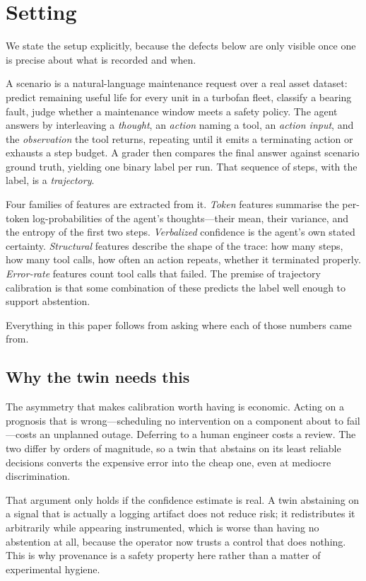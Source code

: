 \documentclass[conference]{IEEEtran}
\begin{document}
\section{Setting}
\label{sec:setting}

We state the setup explicitly, because the defects below are only visible once
one is precise about what is recorded and when.

A scenario is a natural-language maintenance request over a real asset dataset:
predict remaining useful life for every unit in a turbofan fleet, classify a
bearing fault, judge whether a maintenance window meets a safety policy. The
agent answers by interleaving a \emph{thought}, an \emph{action} naming a tool,
an \emph{action input}, and the \emph{observation} the tool returns, repeating
until it emits a terminating action or exhausts a step budget. A grader then
compares the final answer against scenario ground truth, yielding one binary
label per run. That sequence of steps, with the label, is a \emph{trajectory}.

Four families of features are extracted from it. \emph{Token} features summarise
the per-token log-probabilities of the agent's thoughts---their mean, their
variance, and the entropy of the first two steps. \emph{Verbalized} confidence is
the agent's own stated certainty. \emph{Structural} features describe the shape
of the trace: how many steps, how many tool calls, how often an action repeats,
whether it terminated properly. \emph{Error-rate} features count tool calls that
failed. The premise of trajectory calibration is that some combination of these
predicts the label well enough to support abstention.

Everything in this paper follows from asking where each of those numbers came
from.

\subsection{Why the twin needs this}

The asymmetry that makes calibration worth having is economic. Acting on a
prognosis that is wrong---scheduling no intervention on a component about to
fail---costs an unplanned outage. Deferring to a human engineer costs a review.
The two differ by orders of magnitude, so a twin that abstains on its least
reliable decisions converts the expensive error into the cheap one, even at
mediocre discrimination.

That argument only holds if the confidence estimate is real. A twin abstaining on
a signal that is actually a logging artifact does not reduce risk; it
redistributes it arbitrarily while appearing instrumented, which is worse than
having no abstention at all, because the operator now trusts a control that does
nothing. This is why provenance is a safety property here rather than a matter
of experimental hygiene.
\end{document}
